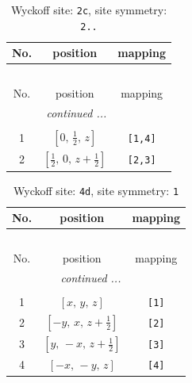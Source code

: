 \documentclass[fleqn,8pt]{jsarticle}
\begin{document}
\begin{longtable}{ccc}
\caption{Wyckoff site: {\tt 2c}, site symmetry: {\tt 2..}}
 \\
 \hline \hline
No. & position & mapping \\ \hline \endfirsthead

\multicolumn{2}{l}{\tablename\ \thetable{}} \\
 \hline \hline
No. & position & mapping \\ \hline \endhead

 \hline \hline
\multicolumn{2}{r}{\footnotesize\it continued ...} \\ \endfoot

 \hline \hline
\multicolumn{2}{r}{} \\ \endlastfoot

1 & $\left[ 0,\, \frac{1}{2},\, z \right]$ & {\tt [1,4]} \\ \hline
2 & $\left[ \frac{1}{2},\, 0,\, z + \frac{1}{2} \right]$ & {\tt [2,3]} \\
\end{longtable}
\renewcommand{\arraystretch}{1.2}
\begin{longtable}{ccc}
\caption{Wyckoff site: {\tt 4d}, site symmetry: {\tt 1}}
 \\
 \hline \hline
No. & position & mapping \\ \hline \endfirsthead

\multicolumn{2}{l}{\tablename\ \thetable{}} \\
 \hline \hline
No. & position & mapping \\ \hline \endhead

 \hline \hline
\multicolumn{2}{r}{\footnotesize\it continued ...} \\ \endfoot

 \hline \hline
\multicolumn{2}{r}{} \\ \endlastfoot

1 & $\left[ x,\, y,\, z \right]$ & {\tt [1]} \\ \hline
2 & $\left[ - y,\, x,\, z + \frac{1}{2} \right]$ & {\tt [2]} \\ \hline
3 & $\left[ y,\, - x,\, z + \frac{1}{2} \right]$ & {\tt [3]} \\ \hline
4 & $\left[ - x,\, - y,\, z \right]$ & {\tt [4]} \\
\end{longtable}
\end{document}
